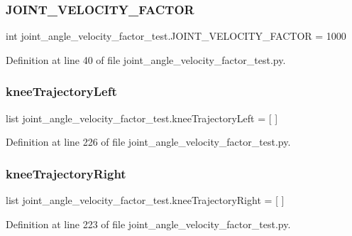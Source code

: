 \subsubsection{\texorpdfstring{JOINT\_VELOCITY\_FACTOR}{JOINT\_VELOCITY\_FACTOR}}
{\footnotesize\ttfamily int joint\+\_\+angle\+\_\+velocity\+\_\+factor\+\_\+test.\+J\+O\+I\+N\+T\+\_\+\+V\+E\+L\+O\+C\+I\+T\+Y\+\_\+\+F\+A\+C\+T\+OR = 1000}



Definition at line 40 of file joint\+\_\+angle\+\_\+velocity\+\_\+factor\+\_\+test.\+py.

\mbox{\label{namespacejoint__angle__velocity__factor__test_a02990b63d14919f3bccda54b5544e584}} 
\subsubsection{\texorpdfstring{kneeTrajectoryLeft}{kneeTrajectoryLeft}}
{\footnotesize\ttfamily list joint\+\_\+angle\+\_\+velocity\+\_\+factor\+\_\+test.\+knee\+Trajectory\+Left = \mbox{[} \mbox{]}}



Definition at line 226 of file joint\+\_\+angle\+\_\+velocity\+\_\+factor\+\_\+test.\+py.

\mbox{\label{namespacejoint__angle__velocity__factor__test_ab296187de6973499055863ea759c4c6b}} 
\subsubsection{\texorpdfstring{kneeTrajectoryRight}{kneeTrajectoryRight}}
{\footnotesize\ttfamily list joint\+\_\+angle\+\_\+velocity\+\_\+factor\+\_\+test.\+knee\+Trajectory\+Right = \mbox{[} \mbox{]}}



Definition at line 223 of file joint\+\_\+angle\+\_\+velocity\+\_\+factor\+\_\+test.\+py.

